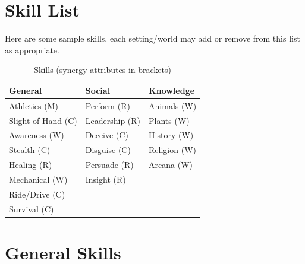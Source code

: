 \documentclass[a4paper,10pt,oneside]{book}
\newcommand{\textlf}[1]{\textbf{\titlecap{#1}}}
\begin{document}
\section{Skill List}
Here are some sample skills, each setting/world may add or remove from this list as appropriate.

\begin{table}[ht!]
	\centering
	\caption{Skills (synergy attributes in brackets)}
	\begin{tabular}{|l|l|l|}
		\hline
		 General & Social & Knowledge\\ [0.5ex]
		\hline
		Athletics (M) & Perform (R) & Animals (W)\\
		Slight of Hand (C) & Leadership (R) & Plants (W)\\
		Awareness (W) & Deceive (C) & History (W)\\
		Stealth (C) & Disguise (C) & Religion (W) \\
		Healing (R)  & Persuade (R) & Arcana (W)\\
		Mechanical (W)  & Insight (R) & \\
		Ride/Drive (C) & & \\
		Survival (C) & & \\
		\hline
	\end{tabular}
\end{table}



\section{General Skills}

%
%
\end{document}
